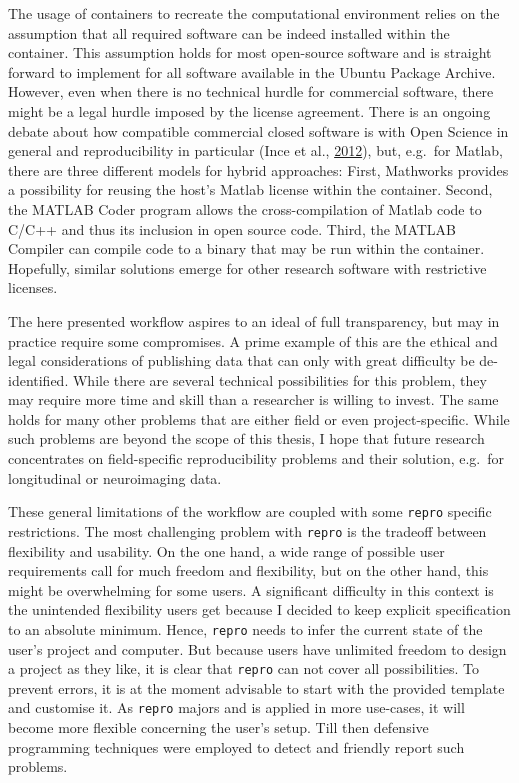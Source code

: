 \documentclass[12pt,a4paper,twoside]{article}
\begin{document}
The usage of containers to recreate the computational environment relies on the assumption that all required software can be indeed installed within the container.
This assumption holds for most open-source software and is straight forward to implement for all software available in the Ubuntu Package Archive.
However, even when there is no technical hurdle for commercial software, there might be a legal hurdle imposed by the license agreement.
There is an ongoing debate about how compatible commercial closed software is with Open Science in general and reproducibility in particular (Ince et al., \protect\hyperlink{ref-inceCaseOpenComputer2012}{2012}), but, e.g.~for Matlab, there are three different models for hybrid approaches:
First, Mathworks provides a possibility for reusing the host's Matlab license within the container.
Second, the MATLAB Coder program allows the cross-compilation of Matlab code to C/C++ and thus its inclusion in open source code.
Third, the MATLAB Compiler can compile code to a binary that may be run within the container.
Hopefully, similar solutions emerge for other research software with restrictive licenses.

The here presented workflow aspires to an ideal of full transparency, but may in practice require some compromises.
A prime example of this are the ethical and legal considerations of publishing data that can only with great difficulty be de-identified.
While there are several technical possibilities for this problem, they may require more time and skill than a researcher is willing to invest.
The same holds for many other problems that are either field or even project-specific.
While such problems are beyond the scope of this thesis, I hope that future research concentrates on field-specific reproducibility problems and their solution, e.g.~for longitudinal or neuroimaging data.

These general limitations of the workflow are coupled with some \texttt{repro} specific restrictions.
The most challenging problem with \texttt{repro} is the tradeoff between flexibility and usability.
On the one hand, a wide range of possible user requirements call for much freedom and flexibility, but on the other hand, this might be overwhelming for some users.
A significant difficulty in this context is the unintended flexibility users get because I decided to keep explicit specification to an absolute minimum.
Hence, \texttt{repro} needs to infer the current state of the user's project and computer.
But because users have unlimited freedom to design a project as they like, it is clear that \texttt{repro} can not cover all possibilities.
To prevent errors, it is at the moment advisable to start with the provided template and customise it.
As \texttt{repro} majors and is applied in more use-cases, it will become more flexible concerning the user's setup.
Till then defensive programming techniques were employed to detect and friendly report such problems.
\end{document}
